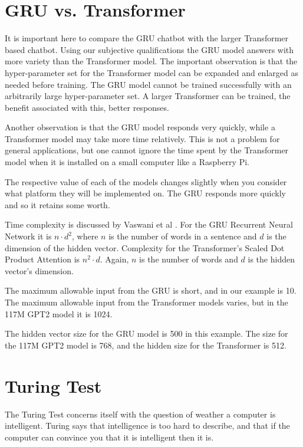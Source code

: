 

\section{GRU vs. Transformer}
It is important here to compare the GRU chatbot with the larger Transformer based chatbot. Using our subjective qualifications the GRU model answers with more variety than the Transformer model. The important observation is that the hyper-parameter set for the Transformer model can be expanded and enlarged as needed before training. The GRU model cannot be trained successfully with an arbitrarily large hyper-parameter set. A larger Transformer can be trained, the benefit associated with this, better responses.

Another observation is that the GRU model responds very quickly, while a Transformer model may take more time relatively. This is not a problem for general applications, but one cannot ignore the time spent by the Transformer model when it is installed on a small computer like a Raspberry Pi. 

The respective value of each of the models changes slightly when you consider what platform they will be implemented on. The GRU responds more quickly and so it retains some worth.

Time complexity is discussed by Vaswani et al \cite{Vaswani2017AttentionIA}. 
For the GRU Recurrent Neural Network it is $ n \cdot d^2 $, where $ n $ is the number of words in a sentence and $ d $ is the dimension of the hidden vector. Complexity for the Transformer's Scaled Dot Product Attention is $ n^2 \cdot  d $. Again, $n$ is the number of words and $d$ is the hidden vector's dimension. 

The maximum allowable input from the GRU is short, and in our example is 10. The maximum allowable input from the Transformer models varies, but in the 117M GPT2 model it is 1024. 

The hidden vector size for the GRU model is 500 in this example. The size for the 117M GPT2 model is 768, and the hidden size for the Transformer is 512.

\section{Turing Test}

The Turing Test concerns itself with the question of weather a computer is intelligent. Turing says that intelligence is too hard to describe, and that if the computer can convince you that it is intelligent then it is.

